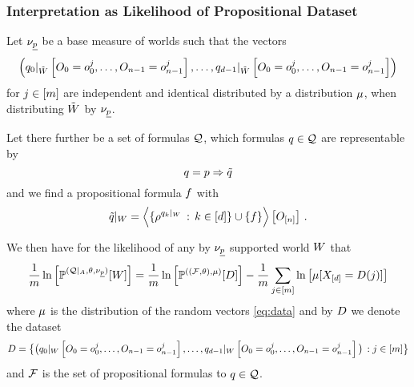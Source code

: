 \subsubsection{Interpretation as Likelihood of Propositional Dataset}


\begin{theorem}\label{the:FOLworldToPLdataset}
	Let $\nu_{\underline{p}}$ be a base measure of worlds such that the vectors
	\begin{align} \label{eq:data}
		\left(  {q_{0}}|_{\tilde{W}} \left[O_{0}=o_{0}^j,\ldots,O_{n-1}=o_{n-1}^j\right], \ldots, 
			{q_{d-1}}|_{\tilde{W}} \left[O_{0}=o_{0}^j,\ldots,O_{n-1}=o_{n-1}^j\right]
		\right) 
	\end{align}
	for $j\in[m]$ are independent and identical distributed by a distribution $\mu$, when distributing $\tilde{W}$ by $\nu_{\underline{p}}$.

	Let there further be a set of formulas $\mathcal{Q}$, which formulas $q\in\mathcal{Q}$ are representable by 
		\[ q = p \Rightarrow \tilde{q} \]
	and we find a propositional formula $f$ with
		\[ {\tilde{q}}|_{W} = \left\langle \{\rho^{{q_{k}}|_{W}} \, : \, k\in[d] \} \cup \{f \}\right\rangle \left[ O_{[n]} \right] \, . \]
		
		
	We then have for the likelihood of any by $\nu_{\underline{p}}$ supported world $W$ that
		\[ 	\frac{1}{m} \ln \left[ \mathbb{P}^{(\mathcal{Q} |_{A},\theta , \nu_{\underline{p}})} [W] \right] = 	\frac{1}{m} \ln \left[ \mathbb{P}^{((\mathcal{F},\theta),\mu)} [D] \right] - \frac{1}{m} \sum_{j\in[m]} \ln \left[ \mu[X_{[d]} = D({j})] \right] \]
	where $\mu$ is the distribution of the random vectors \eqref{eq:data} and by $D$ we denote the dataset
	\begin{align*}
		D = \big\{\big( {q_{0}}|_{W} \left[O_{0}=o_{0}^j,\ldots,O_{n-1}=o_{n-1}^j\right], \ldots ,
				 {q_{d-1}}|_{W} \left[O_{0}=o_{0}^j,\ldots,O_{n-1}=o_{n-1}^j\right] \big) \, : j\in[m] \big\}
	\end{align*}
	and $\mathcal{F}$ is the set of propositional formulas to $q\in\mathcal{Q}$.
\end{theorem}

